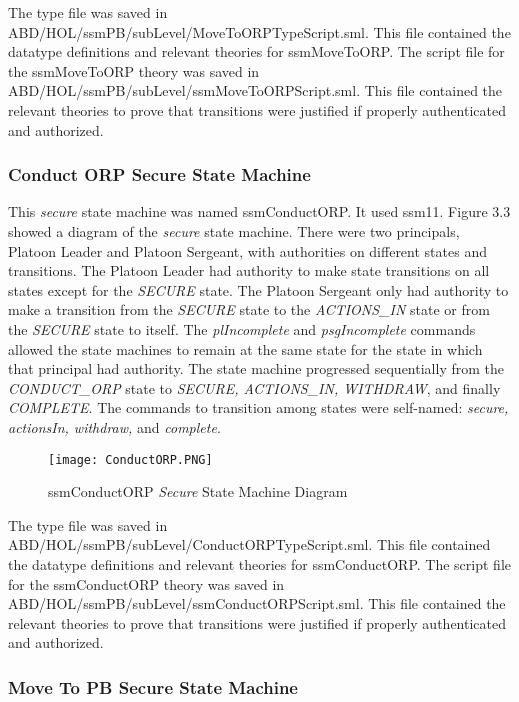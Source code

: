 The type file was saved in ABD/HOL/ssmPB/subLevel/MoveToORPTypeScript.sml.  This file contained the datatype definitions and relevant theories for ssmMoveToORP.  The script file for the ssmMoveToORP theory was saved in ABD/HOL/ssmPB/subLevel/ssmMoveToORPScript.sml. This file contained the relevant theories to prove that transitions were justified if properly authenticated and authorized.

\subsubsection{Conduct ORP Secure State Machine}
\label{sec:conduct-orp-secure}

This \emph{secure} state machine was named ssmConductORP.  It used ssm11.  Figure 3.3 showed a diagram of the \emph{secure} state machine. There were two principals, Platoon Leader and Platoon Sergeant, with authorities on different states and transitions.  The Platoon Leader had authority to make state transitions on all states except for the \emph{SECURE} state.  The Platoon Sergeant only had authority to make a transition from the \emph{SECURE} state to the \emph{ACTIONS_IN} state or from the \emph{SECURE} state to itself.  The \emph{plIncomplete} and \emph{psgIncomplete} commands allowed the state machines to remain at the same state for the state in which that principal had authority.  The state machine progressed sequentially from the \emph{CONDUCT_ORP} state to\emph{ SECURE, ACTIONS_IN, WITHDRAW}, and finally \emph{COMPLETE}.   The commands to transition among states were self-named: \emph{secure, actionsIn, withdraw,} and \emph{complete}.

\begin{figure}[h]
  \centering
  \texttt{[image: ConductORP.PNG]}
  \caption{ssmConductORP \emph{Secure} State Machine Diagram}
\end{figure}

The type file was saved in ABD/HOL/ssmPB/subLevel/ConductORPTypeScript.sml.  This file contained the datatype definitions and relevant theories for ssmConductORP.  The script file for the ssmConductORP theory was saved in ABD/HOL/ssmPB/subLevel/ssmConductORPScript.sml. This file contained the relevant theories to prove that transitions were justified if properly authenticated and authorized.


\subsubsection{Move To PB Secure State Machine}
\label{sec:move-pb-secure}

